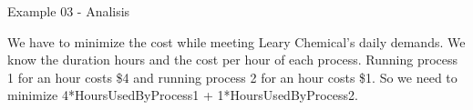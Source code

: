 \begin{frame}{Example 03 - Analisis}

We have to minimize the cost while meeting Leary Chemical's daily demands. We
know the duration hours and the cost per hour of each process. Running process
1 for an hour costs \$4 and running process 2 for an hour costs \$1.
So we need to minimize 4*HoursUsedByProcess1 + 1*HoursUsedByProcess2.

\end{frame}
